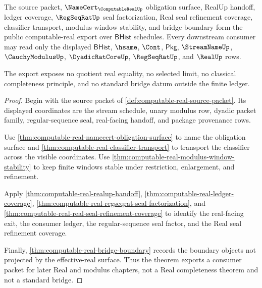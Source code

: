 \begin{theorem}
\label{thm:computable-real-public-export}
The source packet, $\NameCert_{\ComputableRealUp}$ obligation surface, RealUp
handoff, ledger coverage, $\RegSeqRatUp$ seal factorization, Real seal
refinement coverage, classifier transport, modulus-window stability, and
bridge boundary form the public computable-real export over $\mathsf{BHist}$
schedules. Every downstream consumer may read only the displayed
$\mathsf{BHist}$, $\hsame$, $\Cont$, $\mathsf{Pkg}$, $\StreamNameUp$,
$\CauchyModulusUp$, $\DyadicRatCoreUp$, $\RegSeqRatUp$, and $\RealUp$ rows.

The export exposes no quotient real equality, no selected limit, no classical
completeness principle, and no standard bridge datum outside the finite ledger.
\end{theorem}
\begin{proof}
Begin with the source packet of
\autoref{def:computable-real-source-packet}. Its displayed coordinates are the
stream schedule, unary modulus row, dyadic packet family, regular-sequence seal,
real-facing handoff, and package provenance rows.

Use \autoref{thm:computable-real-namecert-obligation-surface} to name the
obligation surface and \autoref{thm:computable-real-classifier-transport} to
transport the classifier across the visible coordinates. Use
\autoref{thm:computable-real-modulus-window-stability} to keep finite windows
stable under restriction, enlargement, and refinement.

Apply \autoref{thm:computable-real-realup-handoff},
\autoref{thm:computable-real-ledger-coverage},
\autoref{thm:computable-real-regseqrat-seal-factorization}, and
\autoref{thm:computable-real-real-seal-refinement-coverage} to identify the
real-facing exit, the consumer ledger, the regular-sequence seal factor, and
the Real seal refinement coverage.

Finally, \autoref{thm:computable-real-bridge-boundary} records the boundary
objects not projected by the effective-real surface. Thus the theorem exports a
consumer packet for later Real and modulus chapters, not a Real completeness
theorem and not a standard bridge.
\end{proof}

